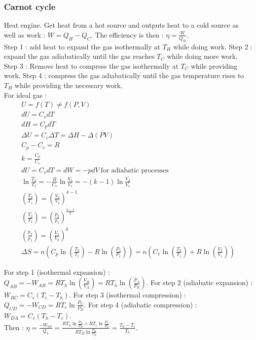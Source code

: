 \documentclass[../main.tex]{subfiles}
\begin{document}
\subsubsection{Carnot cycle}
Heat engine. Get heat from a hot source and outputs heat to a cold source as well as work : $W = Q_H-Q_C$. The efficiency is then : $\eta = \frac{W}{Q_H}$.\\
Step 1 : add heat to expand the gas isothermally at $T_H$ while doing work. Step 2 : expand the gas adiabatically until the gas reaches $T_C$ while doing more work. Step 3 : Remove heat to compress the gas isothermally at $T_C$ while providing work. Step 4 : compress the gas adiabatically until the gas temperature rises to $T_H$ while providing the necessary work.\\

For ideal gas : \begin{equation}
    \begin{gathered}
        U = f(T) \neq f(P,V)\\
        dU = C_v dT\\
        dH = C_p dT\\
        \Delta U = C_v \Delta T = \Delta H - \Delta (PV)\\
        C_p - C_v = R\\
        k = \frac{C_p}{C_v}\\
        dU = C_v dT = dW = -pdV \: \text{for adiabatic processes}\\
        \ln\frac{T_2}{T_1} = -\frac{R}{C_v} \ln \frac{V_2}{V_1} = -(k-1) \ln \frac{V_2}{V_1}\\
        (\frac{T_2}{T_1}) = (\frac{V_1}{V_2})^{k-1}\\
        (\frac{T_2}{T_1}) = (\frac{p_2}{p_1})^{\frac{k-1}{k}}\\
        (\frac{p_2}{p_1}) = (\frac{V_1}{V_2})^k\\
        \Delta S = n(C_p \ln(\frac{T_2}{T_1}) - R\ln(\frac{P_2}{P_1})) = n(C_v\ln(\frac{T_2}{T_1}) + R \ln(\frac{V_2}{V_1}))
    \end{gathered}
\end{equation}

For step 1 (isothermal expansion) : $Q_{AB} = -W_{AB} = RT_h \ln(\frac{V_B}{V_A}) = RT_h\ln(\frac{P_A}{P_B})$. For step 2 (adiabatic expansion) : $W_{BC} = C_v (T_c-T_h)$. For step 3 (isothermal compression) : $Q_{CD} = -W_{CD} = R T_c \ln \frac{P_C}{P_D}$. For step 4 (adiabatic compression) : $W_{DA} = C_v(T_h-T_c)$.\\
Then : $\eta = \frac{-W_{tot}}{Q_h}=\frac{RT_h \ln \frac{P_A}{P_B} + RT_c \ln \frac{P_C}{P_D}}{RT_H \ln \frac{P_A}{P_B}} = \frac{T_h-T_c}{T_h}$.\\
\end{document}
